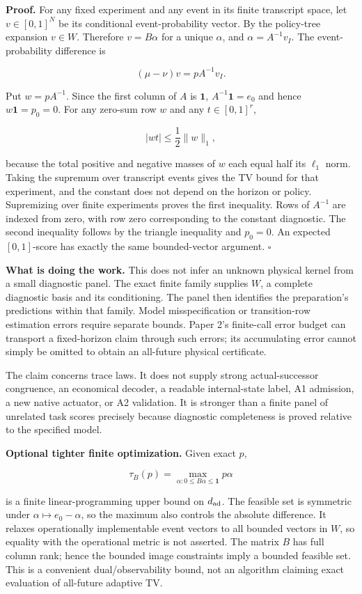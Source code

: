 \documentclass[
  11pt,
  a4paper,
]{article}
\begin{document}
\textbf{Proof.} For any fixed experiment and any event in its finite
transcript space, let \(v\in[0,1]^N\) be its conditional
event-probability vector. By the policy-tree expansion \(v\in W\).
Therefore \(v=B\alpha\) for a unique \(\alpha\), and
\(\alpha=A^{-1}v_I\). The event-probability difference is

\[
(\mu-\nu)v=pA^{-1}v_I.
\]

Put \(w=pA^{-1}\). Since the first column of \(A\) is \(\mathbf1\),
\(A^{-1}\mathbf1=e_0\) and hence \(w\mathbf1=p_0=0\). For any zero-sum
row \(w\) and any \(t\in[0,1]^r\),

\[
|wt|\le\frac12\|w\|_1,
\]

because the total positive and negative masses of \(w\) each equal half
its \(\ell_1\) norm. Taking the supremum over transcript events gives
the TV bound for that experiment, and the constant does not depend on
the horizon or policy. Supremizing over finite experiments proves the
first inequality. Rows of \(A^{-1}\) are indexed from zero, with row
zero corresponding to the constant diagnostic. The second inequality
follows by the triangle inequality and \(p_0=0\). An expected
\([0,1]\)-score has exactly the same bounded-vector argument.
\(\square\)

\textbf{What is doing the work.} This does not infer an unknown physical
kernel from a small diagnostic panel. The exact finite family supplies
\(W\), a complete diagnostic basis and its conditioning. The panel then
identifies the preparation's predictions within that family. Model
misspecification or transition-row estimation errors require separate
bounds. Paper 2's finite-call error budget can transport a fixed-horizon
claim through such errors; its accumulating error cannot simply be
omitted to obtain an all-future physical certificate.

The claim concerns trace laws. It does not supply strong
actual-successor congruence, an economical decoder, a readable
internal-state label, A1 admission, a new native actuator, or A2
validation. It is stronger than a finite panel of unrelated task scores
precisely because diagnostic completeness is proved relative to the
specified model.

\textbf{Optional tighter finite optimization.} Given exact \(p\),

\[
\tau_B(p)=\max_{\alpha:0\le B\alpha\le\mathbf1}p\alpha
\]

is a finite linear-programming upper bound on \(d_{\rm ad}\). The
feasible set is symmetric under \(\alpha\mapsto e_0-\alpha\), so the
maximum also controls the absolute difference. It relaxes operationally
implementable event vectors to all bounded vectors in \(W\), so equality
with the operational metric is not asserted. The matrix \(B\) has full
column rank; hence the bounded image constraints imply a bounded
feasible set. This is a convenient dual/observability bound, not an
algorithm claiming exact evaluation of all-future adaptive TV.
\end{document}
